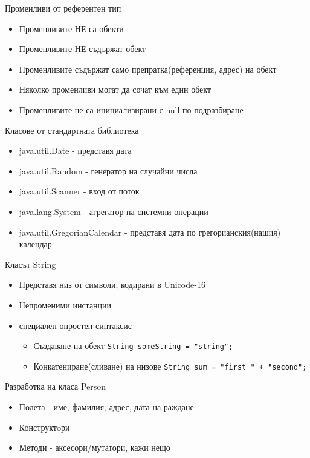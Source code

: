 \documentclass{beamer}
\begin{document}
\begin{frame}{Променливи от референтен тип}
  \transdissolve
  \begin{itemize}
  \item Променливите НЕ са обекти
  \item Променливите НЕ съдържат обект
  \item Променливите съдържат само
    препратка(референция, адрес) на обект
  \item Няколко променливи могат да сочат към
    един обект
  \item Променливите не са инициализирани с
    null по подразбиране
  \end{itemize}
\end{frame}

\begin{frame}{Класове от стандартната библиотека}
  \transdissolve
  \begin{itemize}
  \item java.util.Date -  представя дата
  \item java.util.Random - генератор на случайни числа
  \item java.util.Scanner - вход от поток
  \item java.lang.System - агрегатор на системни
    операции
  \item java.util.GregorianCalendar -  представя дата по
    грегорианския(нашия) календар
  \end{itemize}
\end{frame}

\begin{frame}{Класът String}
  \transdissolve
  \begin{itemize}
  \item Представя низ от символи, кодирани в
    Unicode-16
    \item Непроменими инстанции
    \item специален опростен синтаксис
    \begin{itemize}
    \item Създаване на обект
    \lstinline$String someString = "string";$
    \item Конкатениране(сливане) на низове    
    \lstinline$String sum = "first " + "second";$
    \end{itemize}
  \end{itemize}
\end{frame}

\begin{frame}{Разработка на класа Person}
  \transdissolve
  \begin{itemize}
  \item Полета - име, фамилия, адрес, дата на раждане
  \item Конструктoри
  \item Методи - аксесори/мутатори, кажи нещо
  \end{itemize}
\end{frame}
\end{document}
